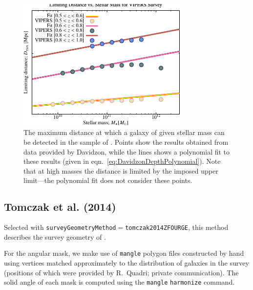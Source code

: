 \begin{figure}
 \begin{center}
 \includegraphics[width=85mm,trim=0mm 0mm 0mm 4mm,clip]{Plots/DataAnalysis/DavidzonVIPERSMassDistanceRelation.pdf}
 \end{center}
 \caption{The maximum distance at which a galaxy of given stellar mass can be detected in the sample of \protect\cite{davidzon_vimos_2013}. Points show the results obtained from data provided by Davidzon, while the lines shows a polynomial fit to these results (given in eqn.~\ref{eq:DavidzonDepthPolynomial}). Note that at high masses the distance is limited by the imposed upper limit---the polynomial fit does not consider these points.}
 \label{fig:Davidzon2013DepthFit}
\end{figure}

\subsection{Tomczak et al. (2014)}\label{phys:surveyGeometry:surveyGeometryTomczak2014ZFOURGE}

Selected with {\tt surveyGeometryMethod}$=${\tt tomczak2014ZFOURGE}, this method describes the survey geometry of \cite{tomczak_galaxy_2014}. 

For the angular mask, we make use of {\tt mangle} polygon files constructed by hand using vertices matched approximately to the distribution of galaxies in the survey (positions of which were provided by R.~Quadri; private communication). The solid angle of each mask is computed using the {\tt mangle} {\tt harmonize} command.

